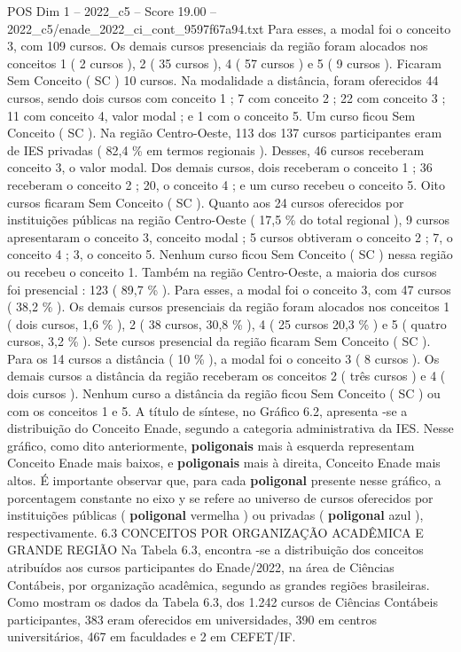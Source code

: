 \begin{textsample}{POS Dim 1 – 2022\_c5 – Score 19.00 – 2022\_c5/enade\_2022\_ci\_cont\_9597f67a94.txt}
Para esses, a modal foi o conceito 3, com 109 cursos.
Os demais cursos presenciais da região foram alocados nos conceitos 1 ( 2 cursos ), 2 ( 35 cursos ), 4 ( 57 cursos ) e 5 ( 9 cursos ).
Ficaram Sem Conceito ( SC ) 10 cursos.
Na modalidade a distância, foram oferecidos 44 cursos, sendo dois cursos com conceito 1 ; 7 com conceito 2 ; 22 com conceito 3 ; 11 com conceito 4, valor modal ; e 1 com o conceito 5.
Um curso ficou Sem Conceito ( SC ).
Na região Centro-Oeste, 113 dos 137 cursos participantes eram de IES privadas ( 82,4 \% em termos regionais ).
Desses, 46 cursos receberam conceito 3, o valor modal.
Dos demais cursos, dois receberam o conceito 1 ; 36 receberam o conceito 2 ; 20, o conceito 4 ; e um curso recebeu o conceito 5.
Oito cursos ficaram Sem Conceito ( SC ).
Quanto aos 24 cursos oferecidos por instituições públicas na região Centro-Oeste ( 17,5 \% do total regional ), 9 cursos apresentaram o conceito 3, conceito modal ; 5 cursos obtiveram o conceito 2 ; 7, o conceito 4 ; 3, o conceito 5.
Nenhum curso ficou Sem Conceito ( SC ) nessa região ou recebeu o conceito 1.
Também na região Centro-Oeste, a maioria dos cursos foi presencial : 123 ( 89,7 \% ).
Para esses, a modal foi o conceito 3, com 47 cursos ( 38,2 \% ).
Os demais cursos presenciais da região foram alocados nos conceitos 1 ( dois cursos, 1,6 \% ), 2 ( 38 cursos, 30,8 \% ), 4 ( 25 cursos 20,3 \% ) e 5 ( quatro cursos, 3,2 \% ).
Sete cursos presencial da região ficaram Sem Conceito ( SC ).
Para os 14 cursos a distância ( 10 \% ), a modal foi o conceito 3 ( 8 cursos ).
Os demais cursos a distância da região receberam os conceitos 2 ( três cursos ) e 4 ( dois cursos ).
Nenhum curso a distância da região ficou Sem Conceito ( SC ) ou com os conceitos 1 e 5.
A título de síntese, no Gráfico 6.2, apresenta -se a distribuição do Conceito Enade, segundo a categoria administrativa da IES.
Nesse gráfico, como dito anteriormente, \textbf{poligonais} mais à esquerda representam Conceito Enade mais baixos, e \textbf{poligonais} mais à direita, Conceito Enade mais altos.
É importante observar que, para cada \textbf{poligonal} presente nesse gráfico, a porcentagem constante no eixo y se refere ao universo de cursos oferecidos por instituições públicas ( \textbf{poligonal} vermelha ) ou privadas ( \textbf{poligonal} azul ), respectivamente. 6.3 CONCEITOS POR ORGANIZAÇÃO ACADÊMICA E GRANDE REGIÃO Na Tabela 6.3, encontra -se a distribuição dos conceitos atribuídos aos cursos participantes do Enade/2022, na área de Ciências Contábeis, por organização acadêmica, segundo as grandes regiões brasileiras.
Como mostram os dados da Tabela 6.3, dos 1.242 cursos de Ciências Contábeis participantes, 383 eram oferecidos em universidades, 390 em centros universitários, 467 em faculdades e 2 em CEFET/IF.

\end{textsample}
